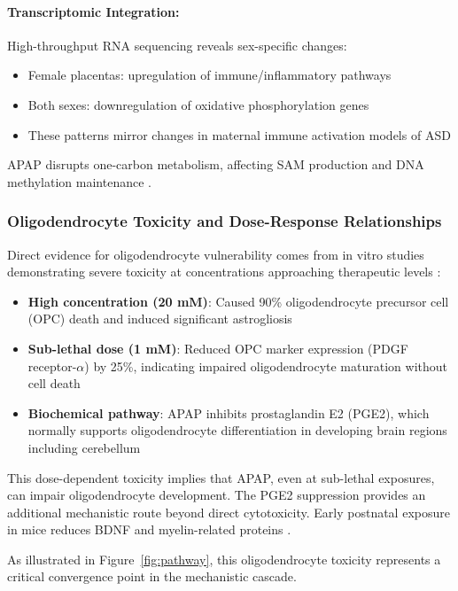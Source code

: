 \documentclass[11pt]{article}
\let\oldsubsubsection\subsubsection
\renewcommand{\subsubsection}[1]{\oldsubsubsection{#1}\setlength{\leftskip}{1.5em}}
\begin{document}
\paragraph{Transcriptomic Integration:}
High-throughput RNA sequencing reveals sex-specific changes:
\begin{itemize}
\item Female placentas: upregulation of immune/inflammatory pathways
\item Both sexes: downregulation of oxidative phosphorylation genes
\item These patterns mirror changes in maternal immune activation models of ASD
\end{itemize}

APAP disrupts one-carbon metabolism, affecting SAM production and DNA methylation maintenance \citep{ji2020}.

\subsubsection{Oligodendrocyte Toxicity and Dose-Response Relationships}

Direct evidence for oligodendrocyte vulnerability comes from in vitro studies demonstrating severe toxicity at concentrations approaching therapeutic levels \citep{perez2012}:

\begin{itemize}
\item \textbf{High concentration (20 mM)}: Caused 90\% oligodendrocyte precursor cell (OPC) death and induced significant astrogliosis
\item \textbf{Sub-lethal dose (1 mM)}: Reduced OPC marker expression (PDGF receptor-$\alpha$) by 25\%, indicating impaired oligodendrocyte maturation without cell death
\item \textbf{Biochemical pathway}: APAP inhibits prostaglandin E2 (PGE2), which normally supports oligodendrocyte differentiation in developing brain regions including cerebellum
\end{itemize}

This dose-dependent toxicity implies that APAP, even at sub-lethal exposures, can impair oligodendrocyte development. The PGE2 suppression provides an additional mechanistic route beyond direct cytotoxicity. Early postnatal exposure in mice reduces BDNF and myelin-related proteins \citep{blecharz2018}.

As illustrated in Figure~\ref{fig:pathway}, this oligodendrocyte toxicity represents a critical convergence point in the mechanistic cascade.
\end{document}
